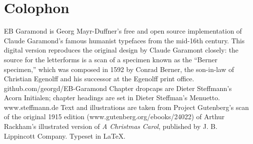 \documentclass[paper=5.5in:8.5in,BCOR=5mm,twoside,DIV=calc,12pt,usegeometry]{scrbook} %
\begin{document}
{}
\chapter*{Colophon}
\pagestyle{empty}
\centering
EB Garamond is Georg Mayr-Duffner's free and open source implementation of Claude Garamond’s famous humanist typefaces from the mid-16th century. This digital version reproduces the original design by Claude Garamont closely: the source for the letterforms is a scan of a specimen known as the “Berner specimen,” which was composed in 1592 by Conrad Berner, the son-in-law of Christian Egenolff and his successor at the Egenolff print office.  github.com/georgd/EB-Garamond
\vfill
Chapter dropcaps are Dieter Steffmann's Acorn Initialen; chapter headings are set in Dieter Steffman's Menuetto. www.steffmann.de
\vfill
Text and illustrations are taken from Project Gutenberg's scan of the original 1915 edition (www.gutenberg.org/ebooks/24022) of Arthur Rackham's illustrated version of \textit{A Christmas Carol}, published by J. B. Lippincott Company.
\vfill
Typeset in \LaTeX{}.
\end{document}
